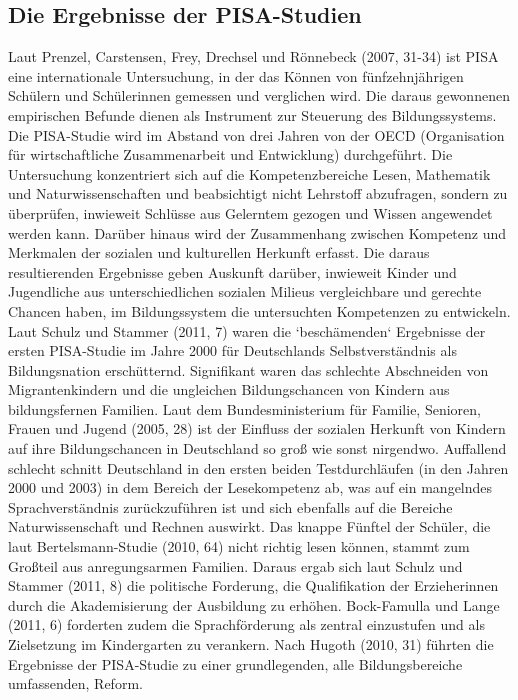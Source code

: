 \subsection{Die Ergebnisse der PISA-Studien}
Laut Prenzel, Carstensen, Frey, Drechsel und Rönnebeck (2007, 31-34) ist PISA eine internationale Untersuchung, in der das Können von fünfzehnjährigen Schülern und Schülerinnen gemessen und verglichen wird. Die daraus gewonnenen empirischen Befunde dienen als Instrument zur Steuerung des Bildungssystems. Die PISA-Studie wird im Abstand von drei Jahren von der OECD (Organisation für wirtschaftliche Zusammenarbeit und Entwicklung) durchgeführt. Die Untersuchung konzentriert sich auf die Kompetenzbereiche Lesen, Mathematik und Naturwissenschaften und beabsichtigt nicht Lehrstoff abzufragen, sondern zu überprüfen, inwieweit Schlüsse aus Gelerntem gezogen und Wissen angewendet werden kann. Darüber hinaus wird der Zusammenhang zwischen Kompetenz und Merkmalen der sozialen und kulturellen Herkunft erfasst. Die daraus resultierenden Ergebnisse geben Auskunft darüber, inwieweit Kinder und Jugendliche aus unterschiedlichen sozialen Milieus vergleichbare und gerechte Chancen haben, im Bildungssystem die untersuchten Kompetenzen zu entwickeln. 
Laut Schulz und Stammer (2011, 7) waren die ‘beschämenden‘ Ergebnisse der ersten PISA-Studie im Jahre 2000 für Deutschlands Selbstverständnis als Bildungsnation erschütternd. Signifikant waren das schlechte Abschneiden von Migrantenkindern und die ungleichen Bildungschancen von Kindern aus bildungsfernen Familien. Laut dem Bundesministerium für Familie, Senioren, Frauen und Jugend (2005, 28) ist der Einfluss der sozialen Herkunft von Kindern auf ihre Bildungschancen in Deutschland so groß wie sonst nirgendwo. Auffallend schlecht schnitt Deutschland in den ersten beiden Testdurchläufen (in den Jahren 2000 und 2003) in dem Bereich der Lesekompetenz ab, was auf ein mangelndes Sprachverständnis zurückzuführen ist und sich ebenfalls auf die Bereiche Naturwissenschaft und Rechnen auswirkt. Das knappe Fünftel der Schüler, die laut Bertelsmann-Studie (2010, 64) nicht richtig lesen können, stammt zum Großteil aus anregungsarmen Familien. 
Daraus ergab sich laut Schulz und Stammer (2011, 8) die politische Forderung, die Qualifikation der Erzieherinnen durch die Akademisierung der Ausbildung zu erhöhen. Bock-Famulla und Lange (2011, 6) forderten zudem die Sprachförderung als zentral einzustufen und als Zielsetzung im Kindergarten zu verankern. Nach Hugoth (2010, 31) führten die Ergebnisse der PISA-Studie zu einer grundlegenden, alle Bildungsbereiche umfassenden, Reform.
 
